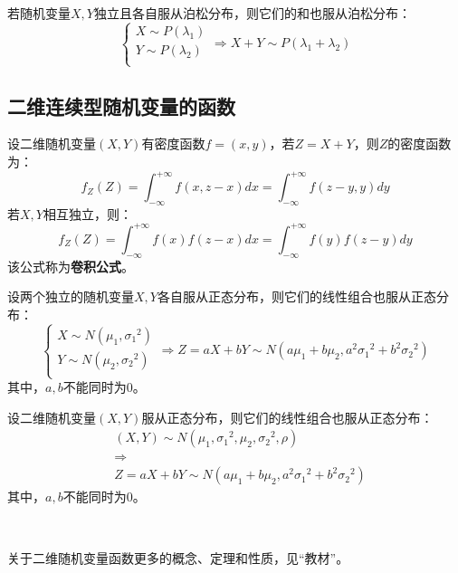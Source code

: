 \begin{theorem}
若随机变量$X,Y$独立且各自服从泊松分布，则它们的和也服从泊松分布：
\[
\begin{cases}
	X\sim P\left( \lambda _1 \right)\\
	Y\sim P\left( \lambda _2 \right)\\
\end{cases}\Rightarrow X+Y\sim P\left( \lambda _1+\lambda _2 \right)
\]
\end{theorem}

\subsection{二维连续型随机变量的函数}

\begin{theorem}[卷积公式]
设二维随机变量$\left( X,Y \right) $有密度函数$f=\left( x,y \right) $，若$Z=X+Y$，则$Z$的密度函数为：
\[
f_Z\left( Z \right) =\int_{-\infty}^{+\infty}{f\left( x,z-x \right) dx}=\int_{-\infty}^{+\infty}{f\left( z-y,y \right) dy}
\]
若$X,Y$相互独立，则：
\[
f_Z\left( Z \right) =\int_{-\infty}^{+\infty}{f\left( x \right) f\left( z-x \right) dx}=\int_{-\infty}^{+\infty}{f\left( y \right) f\left( z-y \right) dy}
\]
该公式称为{\bf 卷积公式}。
\end{theorem}

\begin{theorem}
设两个独立的随机变量$X,Y$各自服从正态分布，则它们的线性组合也服从正态分布：
\[
\begin{cases}
	X\sim N\left( \mu _1,{\sigma _1}^2 \right)\\
	Y\sim N\left( \mu _2,{\sigma _2}^2 \right)\\
\end{cases}\Rightarrow Z=aX+bY\sim N\left( a\mu _1+b\mu _2,a^2{\sigma _1}^2+b^2{\sigma _2}^2 \right)
\]
其中，$a,b$不能同时为0。
\end{theorem}

\begin{theorem}
设二维随机变量$\left( X,Y \right) $服从正态分布，则它们的线性组合也服从正态分布：
\begin{align*}
&\left( X,Y \right) \sim N\left( \mu _1,{\sigma _1}^2,\mu _2,{\sigma _2}^2,\rho \right) \\
&\Rightarrow \\
&Z=aX+bY\sim N\left( a\mu _1+b\mu _2,a^2{\sigma _1}^2+b^2{\sigma _2}^2 \right)
\end{align*}
其中，$a,b$不能同时为0。
\end{theorem}

~

关于二维随机变量函数更多的概念、定理和性质，见“教材\cite{book1}”。




